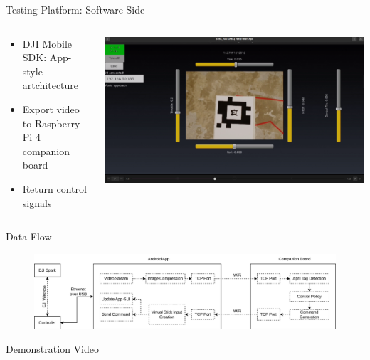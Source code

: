 \documentclass[aspectratio=169]{beamer}
\begin{document}
\begin{frame}{Testing Platform: Software Side}
	\begin{columns}
	\begin{column}{0.5\textwidth}
	\begin{itemize}
		\item DJI Mobile SDK: App-style artchitecture
		\item Export video to Raspberry Pi 4 companion board
		\item Return control signals
	\end{itemize}
	\end{column}
	\begin{column}{0.5\textwidth}
		\centering
		\includegraphics[width=\textwidth]{./images/tablet_screenshot}
	\end{column}
	\end{columns}
\end{frame}

\begin{frame}{Data Flow}
	\begin{figure}
		\centering
		\includegraphics[width=\textwidth]{./images/spark_architecture.drawio}
	\end{figure}
	\href{run:./autonomous_landing_demonstration.mp4}{Demonstration Video}
\end{frame}
\end{document}
